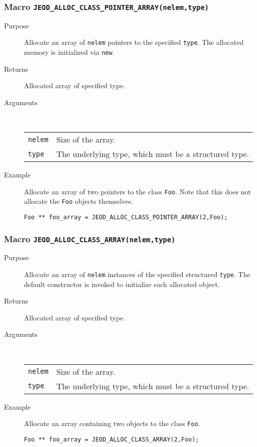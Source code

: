 \subsubsection{Macro {\tt JEOD\_ALLOC\_CLASS\_POINTER\_ARRAY(nelem,type)}}
\begin{description}
\item[Purpose]
Allocate an array of {\tt nelem} pointers to the specified {\tt type}.
The allocated memory is initialized via {\tt new}.
\item[Returns] Allocated array of specified type.
\item[Arguments] \ \\
\begin{tabular}{@{}ll}
{\tt nelem} &  Size of the array. \\
{\tt type} &  The underlying type, which must be a structured type.
\end{tabular}
\item[Example]
Allocate an array of two pointers to the class {\tt Foo}.
Note that this does not allocate the {\tt Foo} objects themselves.\begin{verbatim}
Foo ** foo_array = JEOD_ALLOC_CLASS_POINTER_ARRAY(2,Foo);
\end{verbatim}
\end{description}


\subsubsection{Macro {\tt JEOD\_ALLOC\_CLASS\_ARRAY(nelem,type)}}
\begin{description}
\item[Purpose]
Allocate an array of {\tt nelem} instances of the specified structured
{\tt type}. The default constructor is invoked to initialize each
allocated object.
\item[Returns] Allocated array of specified type.
\item[Arguments] \ \\
\begin{tabular}{@{}ll}
{\tt nelem} &  Size of the array. \\
{\tt type} &  The underlying type, which must be a structured type.
\end{tabular}
\item[Example]
Allocate an array containing two objects to the class {\tt Foo}.
\begin{verbatim}
Foo ** foo_array = JEOD_ALLOC_CLASS_ARRAY(2,Foo);
\end{verbatim}
\end{description}

